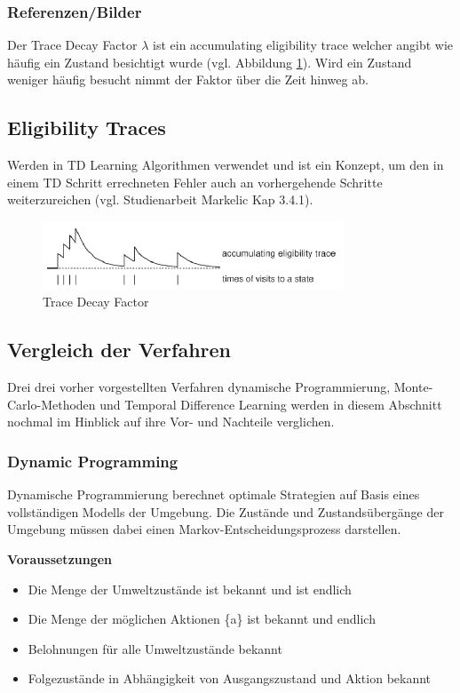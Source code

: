 \documentclass[10pt]{scrartcl}
\begin{document}
\subsubsection{Referenzen/Bilder}
Der Trace Decay Factor $\lambda$ ist ein \glqq accumulating eligibility trace\grqq\xspace welcher angibt wie häufig ein Zustand besichtigt wurde (vgl. Abbildung \ref{fig:Trace}). Wird ein Zustand weniger häufig besucht nimmt der Faktor über die Zeit hinweg ab.\\
\subsection{Eligibility Traces}
Werden in TD Learning Algorithmen verwendet und ist ein Konzept, um den in einem TD
Schritt errechneten Fehler auch an vorhergehende Schritte weiterzureichen (vgl. Studienarbeit
Markelic Kap 3.4.1).

\begin{figure}[htbp]
	\centering	\includegraphics[width=0.8\textwidth]{Bilder/TraceDecay.png}
	\caption{Trace Decay Factor}
	\label{fig:Trace}
\end{figure}

\subsection{Vergleich der Verfahren}
Drei drei vorher vorgestellten Verfahren dynamische Programmierung, Monte-Carlo-Methoden und Temporal Difference Learning werden in diesem Abschnitt nochmal im Hinblick auf ihre Vor- und Nachteile verglichen.

\subsubsection{Dynamic Programming}
Dynamische Programmierung berechnet optimale Strategien auf Basis eines vollständigen Modells der Umgebung. Die Zustände und Zustandsübergänge der Umgebung müssen dabei einen Markov-Entscheidungsprozess darstellen.

\textbf{Voraussetzungen}
\begin{itemize}
\item{Die Menge der Umweltzustände ist bekannt und ist endlich}
\item{Die Menge der möglichen Aktionen \{a\} ist bekannt und endlich}
\item{Belohnungen für alle Umweltzustände bekannt}
\item{Folgezustände in Abhängigkeit von Ausgangszustand und Aktion bekannt}
\end{itemize}
\end{document}
